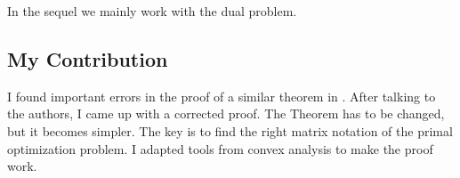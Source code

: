 %
In the sequel we mainly work with the dual problem.

\subsection*{My Contribution}
I found important errors in the proof of a similar theorem in \cite{Wang2019}. After talking to the authors, I came up with a corrected proof. The Theorem has to be changed, but it becomes simpler. The key is to find the right matrix notation of the primal optimization problem. I adapted tools from convex analysis to make the proof work.
